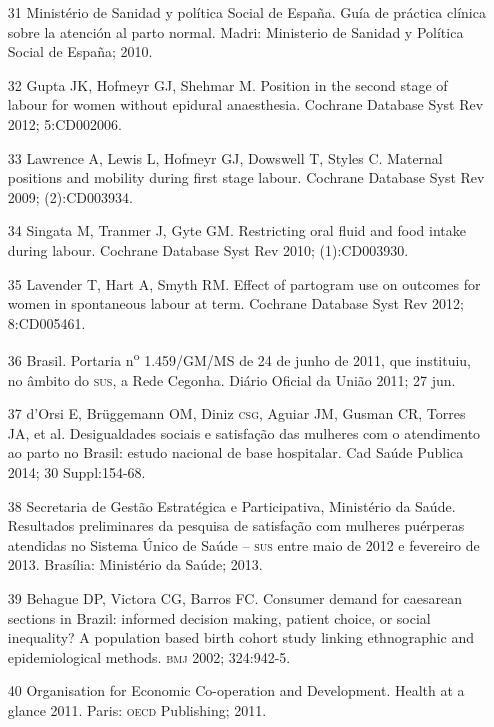 \documentclass{article}
\begin{document}
\begin{itemize}
\item[31] Ministério de Sanidad y política Social de España. Guía de práctica
clínica sobre la atención al parto normal. Madri: Ministerio de Sanidad y
Política Social de España; 2010.

\item[32] Gupta JK, Hofmeyr GJ, Shehmar M. Position in the second stage of
labour for women without epidural anaesthesia. Cochrane Database Syst Rev 2012;
5:CD002006.

\item[33] Lawrence A, Lewis L, Hofmeyr GJ, Dowswell T, Styles C. Maternal
positions and mobility during first stage labour. Cochrane Database Syst Rev
2009; (2):CD003934.

\item[34] Singata M, Tranmer J, Gyte GM. Restricting oral fluid and food
intake during labour. Cochrane Database Syst Rev 2010;
(1):CD003930.

\item[35] Lavender T, Hart A, Smyth RM. Effect of partogram use on outcomes
for women in spontaneous labour at term. Cochrane Database Syst Rev 2012;
8:CD005461.

\item[36] Brasil. Portaria n\textsuperscript{o}
1.459/GM/MS
de 24 de junho de 2011, que instituiu, no âmbito do \textsc{sus}, a Rede Cegonha. Diário
Oficial da União 2011; 27 jun.

\item[37] d’Orsi E, Brüggemann OM, Diniz \textsc{csg}, Aguiar JM, Gusman CR, Torres
JA, et al. Desigualdades sociais e satisfação das mulheres com o atendimento ao
parto no Brasil: estudo nacional de base hospitalar. Cad Saúde Publica 2014; 30
Suppl:154-68.

\item[38] Secretaria de Gestão Estratégica e Participativa, Ministério da
Saúde. Resultados preliminares da pesquisa de satisfação com mulheres puérperas
atendidas no Sistema Único de Saúde – \textsc{sus} entre maio de 2012 e fevereiro de
2013. Brasília: Ministério da Saúde; 2013.

\item[39] Behague DP, Victora CG, Barros FC. Consumer demand for caesarean
sections in Brazil: informed decision making, patient choice, or social
inequality? A population based birth cohort study linking ethnographic and
epidemiological methods. \textsc{bmj} 2002; 324:942-5.

\item[40] Organisation for Economic Co-operation and Development. Health at a
glance 2011. Paris: \textsc{oecd} Publishing; 2011.


\end{itemize}
\end{document}
